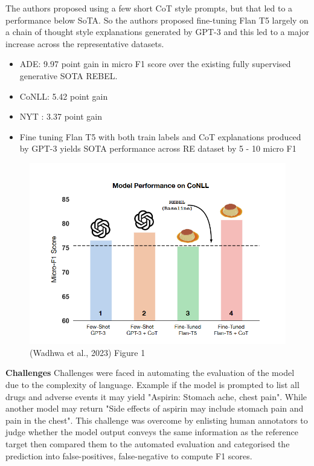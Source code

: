\documentclass[twocolumn, 11pt]{extarticle}
\begin{document}
The authors proposed using a few short CoT style prompts, but that led to a performance below SoTA. So the authors proposed fine-tuning Flan T5 largely on a chain of thought style explanations generated by GPT-3 and this led to a major increase across the representative datasets.

\begin{itemize}
    \item ADE: 9.97 point gain in micro F1 score over the existing fully supervised generative SOTA REBEL.
\end{itemize}
\begin{itemize}
    \item CoNLL: 5.42 point gain
    \item NYT : 3.37 point gain
    \item Fine tuning Flan T5 with both train labels and CoT explanations produced by GPT-3 yields SOTA performance across RE dataset by 5 - 10 micro F1
\end{itemize}

\begin{figure}
    \centering
    \includegraphics[width=1\linewidth]{RE_.png}
    \caption{(Wadhwa et al., 2023) Figure 1 }
    \label{Zero Shot results}
\end{figure}

\textbf{Challenges}
Challenges were faced in automating the evaluation of the model due to the complexity of language. Example if the model is prompted to list all drugs and adverse events it may yield "Aspirin: Stomach ache, chest pain". While another model may return "Side effects of aspirin may include stomach pain and pain in the chest". This challenge was overcome by enlisting human annotators to judge whether the model output conveys the same information as the reference target then compared them to the automated evaluation and categorised the prediction into false-positives, false-negative to compute F1 scores. 
\end{document}
